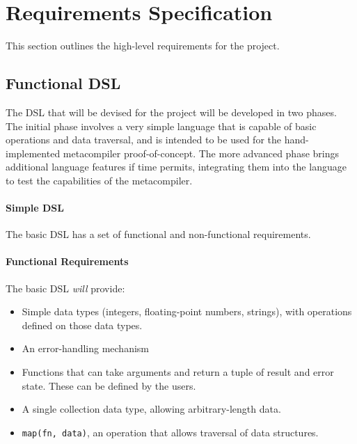 \documentclass[a4paper,11pt]{report}
\begin{document}



\chapter{Requirements Specification} %
\label{cha:requirements_specification}
This section outlines the high-level requirements for the project.

\section{Functional DSL} %
\label{sec:functional_dsl}
The DSL that will be devised for the project will be developed in two phases.
The initial phase involves a very simple language that is capable of basic operations and data traversal, and is intended to be used for the hand-implemented metacompiler proof-of-concept.
The more advanced phase brings additional language features if time permits, integrating them into the language to test the capabilities of the metacompiler.

\subsubsection{Simple DSL} %
\label{ssub:simple_dsl}
The basic DSL has a set of functional and non-functional requirements.

\subsubsection{Functional Requirements} %
\label{ssub:functional_requirements_simple}
The basic DSL \textit{will} provide:
\begin{itemize}
    \item Simple data types (integers, floating-point numbers, strings), with operations defined on those data types.
    \item An error-handling mechanism
    \item Functions that can take arguments and return a tuple of result and error state. 
    These can be defined by the users.
    \item A single collection data type, allowing arbitrary-length data.
    \item \lstinline{map(fn, data)}, an operation that allows traversal of data structures.
\end{itemize}
\end{document}
